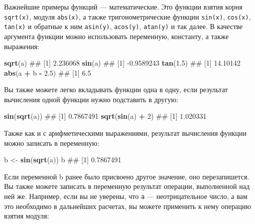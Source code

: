 \documentclass[]{book}
\newenvironment{Shaded}{\begin{snugshade}}{\end{snugshade}}
\newcommand{\KeywordTok}[1]{\textcolor[rgb]{0.13,0.29,0.53}{\textbf{#1}}}
\newcommand{\DecValTok}[1]{\textcolor[rgb]{0.00,0.00,0.81}{#1}}
\newcommand{\FloatTok}[1]{\textcolor[rgb]{0.00,0.00,0.81}{#1}}
\newcommand{\StringTok}[1]{\textcolor[rgb]{0.31,0.60,0.02}{#1}}
\newcommand{\OperatorTok}[1]{\textcolor[rgb]{0.81,0.36,0.00}{\textbf{#1}}}
\newcommand{\NormalTok}[1]{#1}
\begin{document}
Важнейшие примеры функций --- математические. Это функции взятия корня
\texttt{sqrt(x)}, модуля \texttt{abs(x)}, а также тригонометрические
функции \texttt{sin(x)}, \texttt{cos(x)}, \texttt{tan(x)} и обратные к
ним \texttt{asin(y)}, \texttt{acos(y)}, \texttt{atan(y)} и так далее. В
качестве аргумента функции можно использовать переменную, константу, а
также выражения:

\begin{Shaded}
\begin{Highlighting}[]
\KeywordTok{sqrt}\NormalTok{(a)}
\NormalTok{## [1] 2.236068}
\KeywordTok{sin}\NormalTok{(a)}
\NormalTok{## [1] -0.9589243}
\KeywordTok{tan}\NormalTok{(}\FloatTok{1.5}\NormalTok{)}
\NormalTok{## [1] 14.10142}
\KeywordTok{abs}\NormalTok{(a }\OperatorTok{+}\StringTok{ }\NormalTok{b }\OperatorTok{-}\StringTok{ }\FloatTok{2.5}\NormalTok{)}
\NormalTok{## [1] 6.5}
\end{Highlighting}
\end{Shaded}

Вы также можете легко вкладывать функции одна в одну, если результат
вычисления одной функции нужно подставить в другую:

\begin{Shaded}
\begin{Highlighting}[]
\KeywordTok{sin}\NormalTok{(}\KeywordTok{sqrt}\NormalTok{(a))}
\NormalTok{## [1] 0.7867491}
\KeywordTok{sqrt}\NormalTok{(}\KeywordTok{sin}\NormalTok{(a) }\OperatorTok{+}\StringTok{ }\DecValTok{2}\NormalTok{)}
\NormalTok{## [1] 1.020331}
\end{Highlighting}
\end{Shaded}

Также как и с арифметическими выражениями, результат вычисления функции
можно записать в переменную:

\begin{Shaded}
\begin{Highlighting}[]
\NormalTok{b <-}\StringTok{ }\KeywordTok{sin}\NormalTok{(}\KeywordTok{sqrt}\NormalTok{(a))}
\NormalTok{b}
\NormalTok{## [1] 0.7867491}
\end{Highlighting}
\end{Shaded}

Если переменной b ранее было присвоено другое значение, оно
перезапишется. Вы также можете записать в переменную результат операции,
выполненной над ней же. Например, если вы не уверены, что \texttt{a} ---
неотрицательное число, а вам это необходимо в дальнейших расчетах, вы
можете применить к нему операцию взятия модуля:
\end{document}
